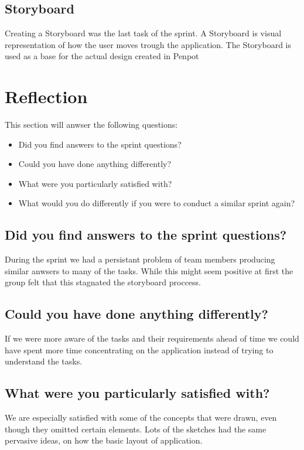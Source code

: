 \documentclass[12pt]{article}
\begin{document}
\subsection{Storyboard}
Creating a Storyboard\cite{Storyboard2024} was the last task of the sprint.
A Storyboard is visual representation of how the user moves trough the application.
The Storyboard is used as a base for the actual design created in Penpot\cite{PenpotDesignTool}

\section{Reflection}
This section will anwser the following questions:
\begin{itemize}
    \item Did you find answers to the sprint questions?
    \item Could you have done anything differently?
    \item What were you particularly satisfied with?
    \item What would you do differently if you were to conduct a similar sprint again?
\end{itemize}

\subsection{Did you find answers to the sprint questions?}
During the sprint we had a persistant problem of team members producing similar anwsers to many of the tasks.
While this might seem positive at first the group felt that this stagnated the storyboard proccess.

\subsection{Could you have done anything differently?}
If we were more aware of the tasks and their requirements ahead of time we could have spent more time
concentrating on the application instead of trying to understand the tasks. 

\subsection{What were you particularly satisfied with?}
We are especially satisfied with some of the concepts that were drawn, even though they omitted certain elements.
Lots of the sketches had the same pervasive ideas, on how the basic layout of application. 
\end{document}
